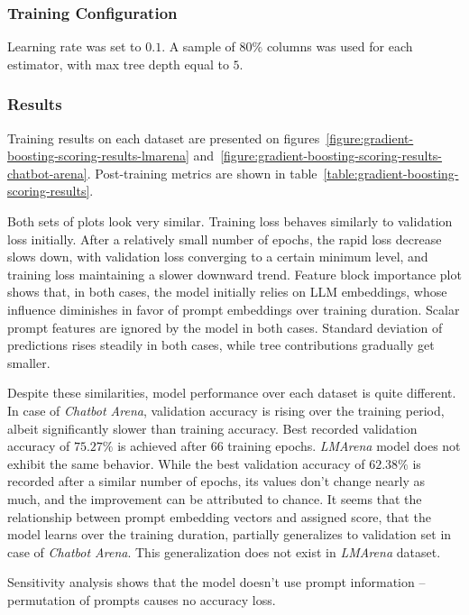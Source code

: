 \documentclass[a4paper,11pt,twoside]{report}
\theoremstyle{definition}
\begin{document}
\subsubsection{Training Configuration}

Learning rate was set to $0.1$. A sample of $80 \%$ columns was used for each estimator, with max tree depth equal to $5$.

\subsubsection{Results}

Training results on each dataset are presented on figures~\ref{figure:gradient-boosting-scoring-results-lmarena} and~\ref{figure:gradient-boosting-scoring-results-chatbot-arena}. Post-training metrics are shown in table~\ref{table:gradient-boosting-scoring-results}.

Both sets of plots look very similar. Training loss behaves similarly to validation loss initially. After a relatively small number of epochs, the rapid loss decrease slows down, with validation loss converging to a certain minimum level, and training loss maintaining a slower downward trend. Feature block importance plot shows that, in both cases, the model initially relies on LLM embeddings, whose influence diminishes in favor of prompt embeddings over training duration. Scalar prompt features are ignored by the model in both cases. Standard deviation of predictions rises steadily in both cases, while tree contributions gradually get smaller.

Despite these similarities, model performance over each dataset is quite different. In case of \textit{Chatbot Arena}, validation accuracy is rising over the training period, albeit significantly slower than training accuracy. Best recorded validation accuracy of $75.27 \%$ is achieved after 66 training epochs. \textit{LMArena} model does not exhibit the same behavior. While the best validation accuracy of $62.38 \%$ is recorded after a similar number of epochs, its values don't change nearly as much, and the improvement can be attributed to chance. It seems that the relationship between prompt embedding vectors and assigned score, that the model learns over the training duration, partially generalizes to validation set in case of \textit{Chatbot Arena}. This generalization does not exist in \textit{LMArena} dataset.

Sensitivity analysis shows that the model doesn't use prompt information -- permutation of prompts causes no accuracy loss.
\end{document}
